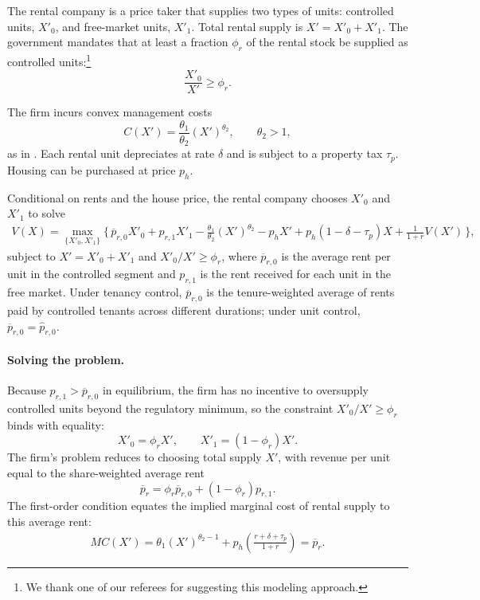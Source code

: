 \documentclass[parskip=full]{article}
\begin{document}
The rental company is a price taker that supplies two types of units: controlled units, $X'_0$, and free-market units, $X'_1$. Total rental supply is $X' = X'_0 + X'_1$. The government mandates that at least a fraction $\phi_r$ of the rental stock be supplied as controlled units:\footnote{We thank one of our referees for suggesting this modeling approach.}
\[
\frac{X'_0}{X'} \geq \phi_r.
\]

The firm incurs convex management costs
\[
C(X') = \frac{\theta_1}{\theta_2} (X')^{\theta_2}, \qquad \theta_2 > 1,
\]
as in \citet{garrigaeetal-2009}. Each rental unit depreciates at rate $\delta$ and is subject to a property tax $\tau_p$. Housing can be purchased at price $p_h$.

Conditional on rents and the house price, the rental company chooses $X'_0$ and $X'_1$ to solve
\begin{align}\label{eq:rental_optimization}
V(X) = \max_{\{X'_0, X'_1\}} \Big\{\, \overline{p}_{r,0} X'_0 + p_{r,1} X'_1 - \frac{\theta_1}{\theta_2}(X')^{\theta_2} - p_h X' + p_h(1-\delta-\tau_p) X + \frac{1}{1+r} V(X') \,\Big\},
\end{align}
subject to $X' = X'_0 + X'_1$ and $X'_0 / X' \geq \phi_r$, where $\overline{p}_{r,0}$ is the average rent per unit in the controlled segment and $p_{r,1}$ is the rent received for each unit in the free market. Under tenancy control, $\overline{p}_{r,0}$ is the tenure-weighted average of rents paid by controlled tenants across different durations; under unit control, $\overline{p}_{r,0} = \hat{p}_{r,0}$.

\paragraph{Solving the problem.} Because $p_{r,1} > \overline{p}_{r,0}$ in equilibrium, the firm has no incentive to oversupply controlled units beyond the regulatory minimum, so the constraint $X'_0/X' \geq \phi_r$ binds with equality:
\[
X'_0 = \phi_r X', \qquad X'_1 = (1 - \phi_r) X'.
\]
The firm's problem reduces to choosing total supply $X'$, with revenue per unit equal to the share-weighted average rent
\[
\overline{p}_r = \phi_r \overline{p}_{r,0} + (1-\phi_r) p_{r,1}.
\]
The first-order condition equates the implied marginal cost of rental supply to this average rent:
\begin{align}\label{eq:rental_MC}
MC(X') = \theta_1 (X')^{\theta_2 - 1} + p_h\left(\frac{r + \delta + \tau_p}{1+r}\right) = \overline{p}_r.
\end{align}
\end{document}

